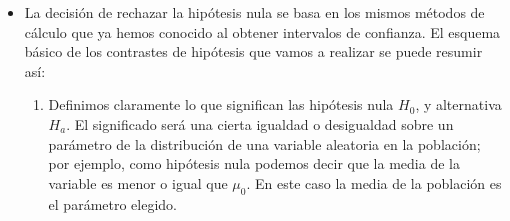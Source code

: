     \begin{itemize}

     \item La decisión de rechazar la hipótesis nula  se basa en los mismos métodos de cálculo que ya hemos conocido al obtener intervalos de confianza. El esquema básico de los contrastes de hipótesis que vamos a realizar se puede resumir así:
         \begin{enumerate}
         \item Definimos claramente lo que significan las hipótesis nula $H_0$, y alternativa $H_a$. El significado será una cierta igualdad o desigualdad sobre un parámetro de la distribución de una variable aleatoria en la población; por ejemplo, como hipótesis nula podemos decir que la media de la variable es menor o igual que $\mu_0$. En este caso la media de la población es el parámetro elegido.


\end{enumerate}
\end{itemize}
